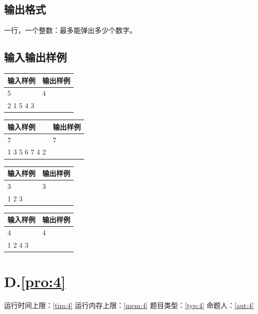 \documentclass[
	lang=cn,
	color=green
]{elegantbook}
\begin{document}
\section*{输出格式}
一行，一个整数：最多能弹出多少个数字。

\section*{输入输出样例}
\begin{tabularx}{450pt}{X|X}
	\toprule
	输入样例  & 输出样例 \\
	\midrule
	5         & 4        \\
	2 1 5 4 3 &          \\
	\bottomrule
\end{tabularx}
\vspace{0.5cm}

\begin{tabularx}{450pt}{X|X}
	\toprule
	输入样例      & 输出样例 \\
	\midrule
	7             & 7        \\
	1 3 5 6 7 4 2 &          \\
	\bottomrule
\end{tabularx}
\vspace{0.5cm}

\begin{tabularx}{450pt}{X|X}
	\toprule
	输入样例 & 输出样例 \\
	\midrule
	3        & 3        \\
	1 2 3    &          \\
	\bottomrule
\end{tabularx}
\vspace{0.5cm}

\begin{tabularx}{450pt}{X|X}
	\toprule
	输入样例 & 输出样例 \\
	\midrule
	4        & 4        \\
	1 2 4 3  &          \\
	\bottomrule
\end{tabularx}

\newpage
\chapter*{D.\quad  \ref*{pro:4}}
\begin{center}
	运行时间上限：\ref*{tim:4} \quad 运行内存上限：\ref*{mem:4} \quad 题目类型：\ref*{typ:4} \quad 命题人：\ref*{aut:4}
\end{center}
\end{document}

